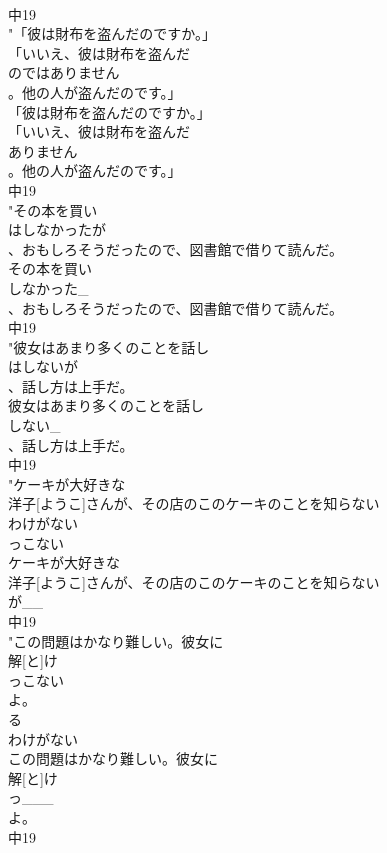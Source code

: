 \documentclass[8pt]{extreport}
\begin{document}
\begin{CJK}{UTF8}{min}
\\	中19
\\	"「彼は財布を盗んだのですか。」
\\	「いいえ、彼は財布を盗んだ
\\	のではありません
\\	。他の人が盗んだのです。」
\\	「彼は財布を盗んだのですか。」
\\	「いいえ、彼は財布を盗んだ
\\	ありません
\\	。他の人が盗んだのです。」
\\	中19
\\	"その本を買い
\\	はしなかったが
\\	、おもしろそうだったので、図書館で借りて読んだ。
\\	その本を買い
\\	しなかった_
\\	、おもしろそうだったので、図書館で借りて読んだ。
\\	中19
\\	"彼女はあまり多くのことを話し
\\	はしないが
\\	、話し方は上手だ。
\\	彼女はあまり多くのことを話し
\\	しない_
\\	、話し方は上手だ。
\\	中19
\\	"ケーキが大好きな
\\	洋子[ようこ]さんが、その店のこのケーキのことを知らない
\\	わけがない
\\	っこない
\\	ケーキが大好きな
\\	洋子[ようこ]さんが、その店のこのケーキのことを知らない
\\	が__
\\	中19
\\	"この問題はかなり難しい。彼女に
\\	解[と]け
\\	っこない
\\	よ。
\\	る
\\	わけがない
\\	この問題はかなり難しい。彼女に
\\	解[と]け
\\	っ___
\\	よ。
\\	中19

\end{CJK}
\end{document}
